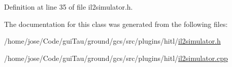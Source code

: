 Definition at line 35 of file il2simulator.\-h.



The documentation for this class was generated from the following files\-:\begin{DoxyCompactItemize}
\item 
/home/jose/\-Code/gui\-Tau/ground/gcs/src/plugins/hitl/\hyperlink{il2simulator_8h}{il2simulator.\-h}\item 
/home/jose/\-Code/gui\-Tau/ground/gcs/src/plugins/hitl/\hyperlink{il2simulator_8cpp}{il2simulator.\-cpp}\end{DoxyCompactItemize}
